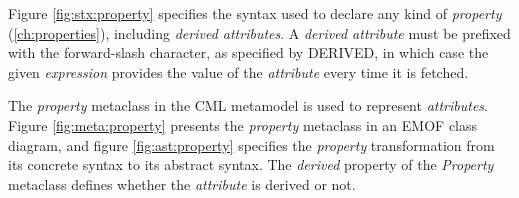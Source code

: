 Figure \ref{fig:stx:property} specifies the syntax used
to declare any kind of \emph{property} (\ref{ch:properties}),
including \emph{derived attributes}.
A \emph{derived attribute} must be prefixed with the forward-slash character,
as specified by DERIVED,
in which case the given \emph{expression} provides the value
of the \emph{attribute} every time it is fetched.

The \emph{property} metaclass in the CML metamodel is used to represent
\emph{attributes}.
Figure \ref{fig:meta:property} presents the \emph{property} metaclass
in an EMOF \cite{mof} class diagram,
and figure \ref{fig:ast:property} specifies
the \emph{property} transformation
from its concrete syntax to its abstract syntax.
The \emph{derived} property of the \emph{Property} metaclass
defines whether the \emph{attribute} is derived or not.
